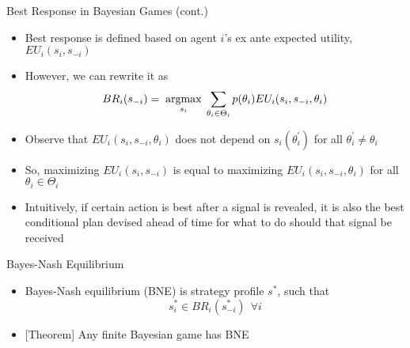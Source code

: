 \documentclass[11pt,aspectratio=169]{beamer}
\begin{document}
  
  \begin{frame}{Best Response in Bayesian Games (cont.)} \small
   \begin{itemize}[<+->]
    \item Best response is defined based on agent $i$'s \alert{ex ante} expected utility, $EU_i(s_i, s_{-i})$
    \item However, we can rewrite it as
    $$BR_i(s_{-i})= \; \underset{s_i}{\operatorname*{argmax}} \; \sum_{\theta_i\in\Theta_i}p(\theta_i)EU_i(s_i,s_{-i},\theta_i)$$
    \item Observe that $EU_i(s_i, s_{-i}, \theta_i)$ \alert{does not depend on} $s_i(\theta_i^\prime)$ for all $\theta_i^\prime \ne \theta_i$
    \item So, maximizing $EU_i(s_i,s_{-i})$ is equal to maximizing $EU_i(s_i,s_{-i},\theta_i)$ for all $\theta_i \in \Theta_i$
    \item Intuitively, if certain action is best after a signal is revealed, it is also the best \alert{conditional plan} devised \alert{ahead of time} for what to do should that signal be received
   \end{itemize}
  \end{frame}
  
  
  \begin{frame}{Bayes-Nash Equilibrium}
    \begin{itemize}
     \item \alert{Bayes-Nash equilibrium (BNE)} is strategy profile $s^*$, such that
     $$s^*_i\in BR_i(s^*_{-i}) ~~\forall i$$
     \item \alert{[Theorem]} Any finite Bayesian game has BNE
    \end{itemize}
  \end{frame}
  
\end{document}
